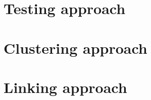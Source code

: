 \label{chapter:approach}
\section{Testing approach}
\label{approach:testing}
\section{Clustering approach}
\label{approach:clustering}
\section{Linking approach}
\label{approach:linking}